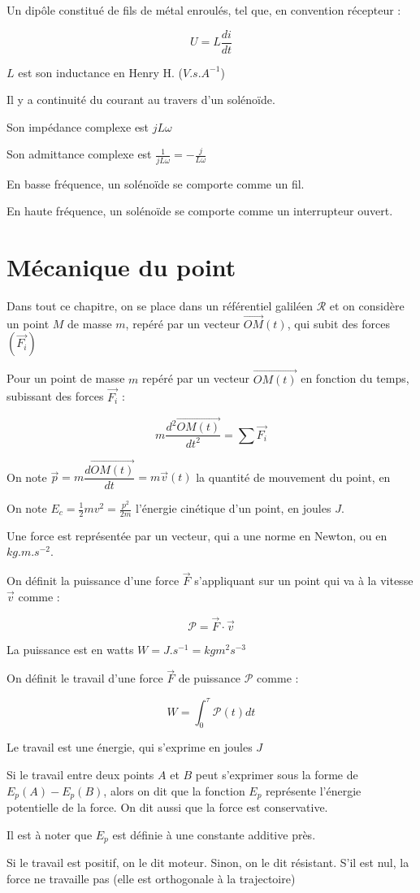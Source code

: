 \documentclass[a4paper,12pt]{book}
\newcommand{\Def}[2]{\begin{tcolorbox}[colback=white,colframe=red!10!green!20!blue!75!, title=Définition : #1]#2\end{tcolorbox}}
\newcommand{\Thr}[2]{\begin{tcolorbox}[sharp corners, colback=white,colframe=red!10!blue!30!green!75!, title=Théorème : #1]#2\end{tcolorbox}}
\begin{document}
\Def{Le solénoïde}{Un dipôle constitué de fils de métal enroulés, tel que, en convention récepteur :
\par $$U = L\dfrac{di}{dt}$$
\par $L$ est son inductance en Henry H. ($V.s.A^{-1}$)
\par Il y a continuité du courant au travers d'un solénoïde.
\par Son impédance complexe est $jL\omega$
\par Son admittance complexe est $\frac{1}{jL\omega}=-\frac{j}{L\omega}$
\par En basse fréquence, un solénoïde se comporte comme un fil.
\par En haute fréquence, un solénoïde se comporte comme un interrupteur ouvert.}


\section{Mécanique du point}
Dans tout ce chapitre, on se place dans un référentiel galiléen $\mathcal{R}$ et on considère un point $M$ de masse $m$, repéré par un vecteur $\overrightarrow{OM}(t)$, qui subit des forces $(\vec{F_i})$
\Thr{RFD}{Pour un point de masse $m$ repéré par un vecteur $\overrightarrow{OM(t)}$ en fonction du temps, subissant des forces $\vec{F_i}$ :
\par $$m\dfrac{d^2\overrightarrow{OM(t)}}{dt^2} = \sum\vec{F_i}$$
\par On note $\vec{p} = m\dfrac{d\overrightarrow{OM(t)}}{dt} = m\vec{v}(t)$ la quantité de mouvement du point, en 
\par On note $E_c=\frac{1}{2}mv^2 =\frac{p^2}{2m}$ l'énergie cinétique d'un point, en joules $J$.}
\Def{Grandeurs relatives à une force}{Une force est représentée par un vecteur, qui a une norme en Newton, ou en $kg.m.s^{-2}$.
\par On définit la puissance d'une force $\vec{F}$ s'appliquant sur un point qui va à la vitesse $\vec{v}$ comme :
\par $$\mathcal{P}=\vec{F}\cdot\vec{v}$$
\par La puissance est en watts $W=J.s^{-1} = kgm^2s^{-3}$
\par On définit le travail d'une force $\vec{F}$ de puissance $\mathcal{P}$ comme :
\par $$W = \int_0^\tau\mathcal{P}(t)dt$$
\par Le travail est une énergie, qui s'exprime en joules $J$
\par Si le travail entre deux points $A$ et $B$ peut s'exprimer sous la forme de $E_p(A)-E_p(B)$, alors on dit que la fonction $E_p$ représente l'énergie potentielle de la force. On dit aussi que la force est conservative.
\par Il est à noter que $E_p$ est définie à une constante additive près.
\par Si le travail est positif, on le dit moteur. Sinon, on le dit résistant. S'il est nul, la force ne travaille pas (elle est orthogonale à la trajectoire)}
\end{document}
